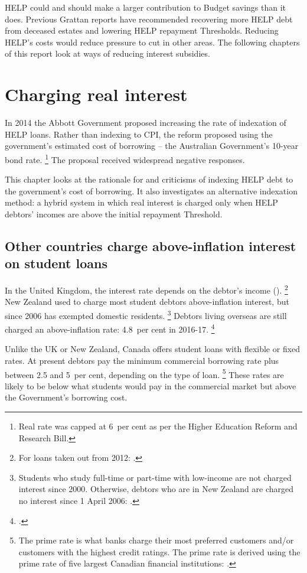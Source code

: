 \documentclass[embargoed]{grattan}
\begin{document}
\gls{HELP} could and should make a larger contribution to Budget savings than it does.
Previous Grattan reports have recommended recovering more \gls{HELP} debt from deceased estates and lowering \gls{HELP} repayment \gls{Threshold}s.
Reducing \gls{HELP}'s costs would reduce pressure to cut in other areas.
The following chapters of this report look at ways of reducing interest subsidies.

\chapter{Charging real interest}\label{chap:5-charging-real-interest}

In 2014 the Abbott Government proposed increasing the rate of indexation of \gls{HELP} loans.
Rather than indexing to \gls{CPI}, the reform proposed using the government's estimated cost of borrowing -- the Australian Government's 10-year bond rate.%
\footnote{Real rate was capped at 6~per cent as per the Higher Education Reform and Research Bill.} 
The proposal received widespread negative responses.

This chapter looks at the rationale for and criticisms of indexing \gls{HELP} debt to the government's cost of borrowing.
It also investigates an alternative indexation method: a hybrid system in which real interest is charged only when \gls{HELP} debtors' incomes are above the initial repayment \gls{Threshold}.

\section{Other countries charge above-inflation interest on student loans}\label{other-countries-charge-above-inflation-interest-on-student-loans}

In the United Kingdom, the interest rate depends on the debtor's income ().%
\footnote{For loans taken out from 2012: \textcite{Company2015Changesinterestrates}.}
New Zealand used to charge most student debtors above-inflation interest, but since 2006 has exempted domestic residents.%
\footnote{Students who study full-time or part-time with low-income are not charged interest since 2000.
Otherwise, debtors who are in New Zealand are charged no interest since 1 April 2006: \textcite[][50]{EducationNZ2015Studentloanscheme}.} 
Debtors living overseas are still charged an above-inflation rate: 4.8~per cent in 2016-17.%
\footcite{InlandRevenue2016Interestothercharges}

Unlike the UK or New Zealand, Canada offers student loans with flexible or fixed rates.
At present debtors pay the minimum commercial borrowing rate plus between 2.5 and 5~per cent, depending on the type of loan.%
\footnote{The prime rate is what banks charge their most preferred customers and/or customers with the highest credit ratings.
The prime rate is derived using the prime rate of five largest Canadian financial institutions: \textcites{Canada2016InterestratesCanada}{Canada2016LoanRepaymentEstimator}.} 
These rates are likely to be below what students would pay in the commercial market but above the Government's borrowing cost.
\end{document}
